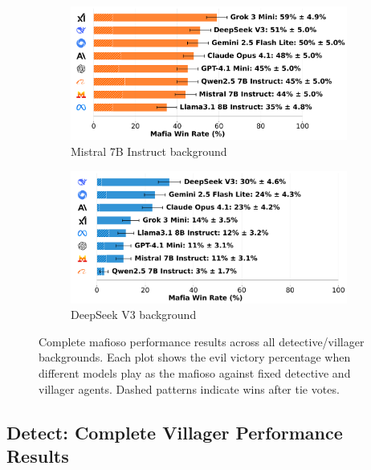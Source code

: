 \documentclass{article}
\begin{document}
\begin{figure}[htbp]
    \begin{subfigure}[b]{0.48\textwidth}
        \centering
        \includegraphics[width=\textwidth]{../results/mafioso_mistral_7b_instruct_v4_1_benchmark.png}
        \caption{Mistral 7B Instruct background}
        \label{fig:mafioso_mistral_appendix}
    \end{subfigure}
    \hfill
    \begin{subfigure}[b]{0.48\textwidth}
        \centering
        \includegraphics[width=\textwidth]{../results/mafioso_deepseek_v3_v4_1_benchmark.png}
        \caption{DeepSeek V3 background}
        \label{fig:mafioso_deepseek_appendix}
    \end{subfigure}
    \caption{Complete mafioso performance results across all detective/villager backgrounds. Each plot shows the evil victory percentage when different models play as the mafioso against fixed detective and villager agents. Dashed patterns indicate wins after tie votes.}
    \label{fig:mafioso_complete}
\end{figure}

\subsection{Detect: Complete Villager Performance Results}
\end{document}
